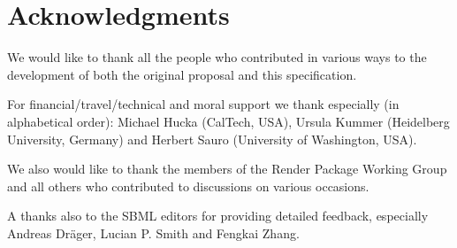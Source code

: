 
\section{Acknowledgments}

We would like to thank all the people who contributed in various ways to the development of both the original proposal and this specification.

For financial/travel/technical and moral support we thank especially (in alphabetical order): Michael Hucka (CalTech, USA), Ursula Kummer (Heidelberg University, Germany) and Herbert Sauro (University of Washington, USA).

We also would like to thank the members of the \textsf{Render Package Working Group} and all others who contributed to discussions on various occasions.

A thanks also to the SBML editors for providing detailed feedback, especially Andreas Dr\"ager, Lucian P. Smith and Fengkai Zhang. 

